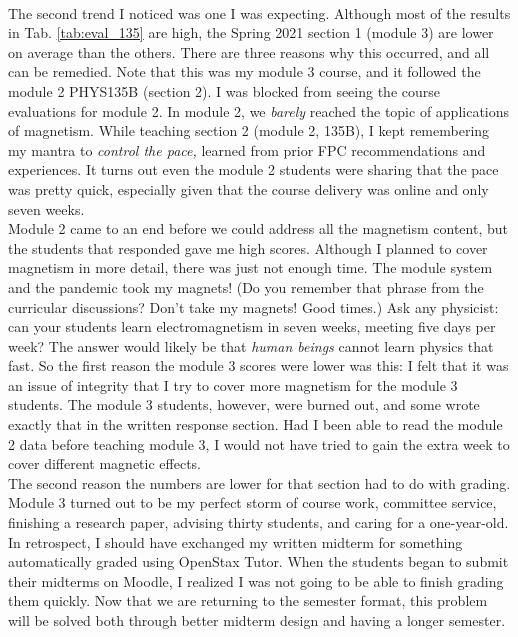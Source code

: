 \documentclass[../../main.tex]{subfiles}
\begin{document}
\\
\vspace{0.25cm}
The second trend I noticed was one I was expecting.  Although most of the results in Tab. \ref{tab:eval_135} are high, the Spring 2021 section 1 (module 3) are lower on average than the others.  There are three reasons why this occurred, and all can be remedied.  Note that this was my module 3 course, and it followed the module 2 PHYS135B (section 2).  I was blocked from seeing the course evaluations for module 2.  In module 2, we \textit{barely} reached the topic of applications of magnetism.  While teaching section 2 (module 2, 135B), I kept remembering my mantra to \textit{control the pace,} learned from prior FPC recommendations and experiences.  It turns out even the module 2 students were sharing that the pace was pretty quick, especially given that the course delivery was online and only seven weeks.
\\
\vspace{0.25cm}
Module 2 came to an end before we could address all the magnetism content, but the students that responded gave me high scores.  Although I planned to cover magnetism in more detail, there was just not enough time.  The module system and the pandemic took my magnets!  (Do you remember that phrase from the curricular discussions?  Don't take my magnets!  Good times.)  Ask any physicist: can your students learn electromagnetism in seven weeks, meeting five days per week?  The answer would likely be that \textit{human beings} cannot learn physics that fast.  So the first reason the module 3 scores were lower was this: I felt that it was an issue of integrity that I try to cover more magnetism for the module 3 students.  The module 3 students, however, were burned out, and some wrote exactly that in the written response section.  Had I been able to read the module 2 data before teaching module 3, I would not have tried to gain the extra week to cover different magnetic effects.
\\
\vspace{0.25cm}
The second reason the numbers are lower for that section had to do with grading.  Module 3 turned out to be my perfect storm of course work, committee service, finishing a research paper, advising thirty students, and caring for a one-year-old.  In retrospect, I should have exchanged my written midterm for something automatically graded using OpenStax Tutor.  When the students began to submit their midterms on Moodle, I realized I was not going to be able to finish grading them quickly.  Now that we are returning to the semester format, this problem will be solved both through better midterm design and having a longer semester.
\end{document}
